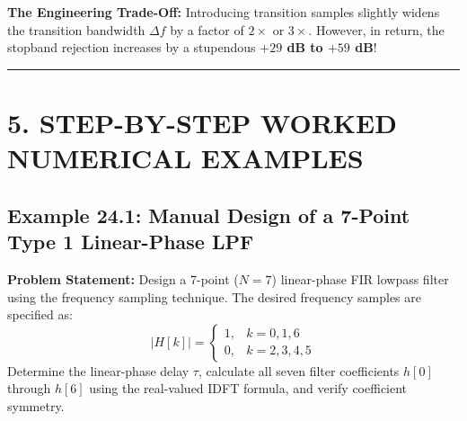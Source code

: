 \documentclass[11pt,a4paper]{article}
\begin{document}
\begin{table}[H]
\centering
\caption{Optimal Transition Sample Values and Resulting Stopband Attenuation}
\label{tab:rabiner_gold}
\vspace{2mm}
\end{table}

\noindent\textbf{The Engineering Trade-Off:}
Introducing transition samples slightly widens the transition bandwidth $\Delta f$ by a factor of $2\times$ or $3\times$. However, in return, the stopband rejection increases by a stupendous \textbf{$+29$ dB to $+59$ dB}!

\noindent\rule{\textwidth}{0.5pt}

\section{5. STEP-BY-STEP WORKED NUMERICAL EXAMPLES}

\subsection{Example 24.1: Manual Design of a 7-Point Type 1 Linear-Phase LPF}
\textbf{Problem Statement:} Design a 7-point ($N=7$) linear-phase FIR lowpass filter using the frequency sampling technique. The desired frequency samples are specified as:
\begin{equation}
|H[k]| = \begin{cases} 1, & k = 0, 1, 6 \\ 0, & k = 2, 3, 4, 5 \end{cases}
\end{equation}
Determine the linear-phase delay $\tau$, calculate all seven filter coefficients $h[0]$ through $h[6]$ using the real-valued IDFT formula, and verify coefficient symmetry.
\end{document}

